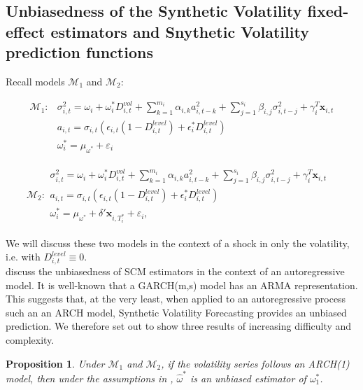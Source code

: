 \documentclass[11pt]{article}
\newcommand{\x}{\textbf{x}}
\def\mbf#1{\mathbf{#1}} %
\def\mc#1{\mathcal{#1}} %
\def\mc#1{\mathcal{#1}}
\newtheorem{prop}{Proposition}
\theoremstyle{definition}
\begin{document}
\subsection{Unbiasedness of the Synthetic Volatility fixed-effect estimators and Snythetic Volatility prediction functions}

Recall models $\mc{M}_1$ and $\mc{M}_2$:

\begin{align*}
\mc{M}_1 \colon &\sigma^{2}_{i,t} = \omega_{i} + \omega^{*}_i D^{vol}_{i,t} + \sum^{m_{i}}_{k=1}\alpha_{i,k}a^{2}_{i,t-k} + \sum_{j=1}^{s_{i}}\beta_{i,j}\sigma_{i,t-j}^{2} + \gamma_{i}^{T} \x_{i,t}\\
&a_{i,t} = \sigma_{i,t}(\epsilon_{i,t}(1-D^{level}_{i,t}) + \epsilon^{*}_{i}D^{level}_{i,t}) \\
&\omega_i^{*} = \mu_{\omega^{*}} + \varepsilon_{i} \label{model1}
\end{align*}

\begin{align*}
  \mc{M}_2 \colon \begin{array}{l}
     \sigma^{2}_{i,t} = \omega_{i} + \omega^{*}_i D^{vol}_{i,t} + \sum^{m_{i}}_{k=1}\alpha_{i,k}a^{2}_{i,t-k} + \sum_{j=1}^{s_{i}}\beta_{i,j}\sigma_{i,t-j}^{2} + \gamma_{i}^{T} \x_{i,t} \text{ }\\[.2cm]
     a_{i,t} = \sigma_{i,t}(\epsilon_{i,t}(1-D^{level}_{i,t}) + \epsilon^{*}_{i}D^{level}_{i,t})\\[.2cm]
     \omega_i^{*} = \mu_{\omega^{*}}+\delta'\mbf{x}_{i, T_i^*}+ \varepsilon_{i},
  \end{array}
  \end{align*}

We will discuss these two models in the context of a shock in only the volatility, i.e. with $D^{level}_{i,t} \equiv 0$.\\

\citet{abadie2010synthetic} discuss the unbiasedness of SCM estimators in the context of an autoregressive model.  It is well-known that a GARCH(m,s) model has an ARMA representation.  This suggests that, at the very least, when applied to an autoregressive process such an an ARCH model, Synthetic Volatility Forecasting provides an unbiased prediction.  We therefore set out to show three results of increasing difficulty and complexity.

\begin{prop}
Under $\mc{M}_1$ and $\mc{M}_2$, if the volatility series follows an ARCH(1) model, then under the assumptions in \citet{abadie2010synthetic}, $\hat\omega^{*}$ is an unbiased estimator of $\omega_{1}^{*}$.
\end{prop}
\end{document}
